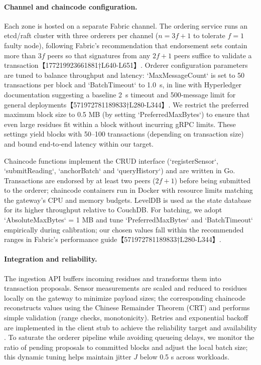 \documentclass[12pt,onecolumn]{IEEEtran} %
\begin{document}
\paragraph{Channel and chaincode configuration.}
Each zone is hosted on a separate Fabric channel.  The ordering service runs an etcd/raft cluster with three orderers per channel (\(n=3f+1\) to tolerate \(f=1\) faulty node), following Fabric’s recommendation that endorsement sets contain more than \(3f\) peers so that signatures from any \(2f+1\) peers suffice to validate a transaction【177219923661881†L640-L651】.  Orderer configuration parameters are tuned to balance throughput and latency: `MaxMessageCount` is set to 50 transactions per block and `BatchTimeout` to 1.0~s, in line with Hyperledger documentation suggesting a baseline 2~s timeout and 500‑message limit for general deployments【571972781189833†L280-L344】.  We restrict the preferred maximum block size to 0.5 MB (by setting `PreferredMaxBytes`) to ensure that even large residues fit within a block without incurring gRPC limits.  These settings yield blocks with 50–100 transactions (depending on transaction size) and bound end‑to‑end latency within our \SLOpL{} target.

Chaincode functions implement the CRUD interface (`registerSensor`, `submitReading`, `anchorBatch` and `queryHistory`) and are written in Go.  Transactions are endorsed by at least two peers (\(2f+1\)) before being submitted to the orderer; chaincode containers run in Docker with resource limits matching the gateway’s CPU and memory budgets.  LevelDB is used as the state database for its higher throughput relative to CouchDB.  For batching, we adopt `AbsoluteMaxBytes` = 1 MB and tune `PreferredMaxBytes` and `BatchTimeout` empirically during calibration; our chosen values fall within the recommended ranges in Fabric’s performance guide【571972781189833†L280-L344】.

\paragraph{Integration and reliability.}
The ingestion API buffers incoming residues and transforms them into transaction proposals.  Sensor measurements are scaled and reduced to residues locally on the gateway to minimize payload sizes; the corresponding chaincode reconstructs values using the Chinese Remainder Theorem (CRT) and performs simple validation (range checks, monotonicity).  Retries and exponential backoff are implemented in the client stub to achieve the reliability target \SLOR{} and availability \SLOA{}.  To saturate the orderer pipeline while avoiding queueing delays, we monitor the ratio of pending proposals to committed blocks and adjust the local batch size; this dynamic tuning helps maintain jitter \(J\) below 0.5 s across workloads.
\end{document}
